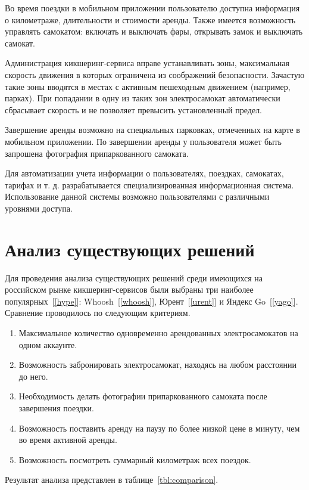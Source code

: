 Во время поездки в мобильном приложении пользователю доступна информация о километраже, длительности и стоимости аренды. Также имеется возможность управлять самокатом: включать и выключать фары, открывать замок и выключать самокат.

Администрация кикшеринг-сервиса вправе устанавливать зоны, максимальная скорость движения в которых ограничена из соображений безопасности. Зачастую такие зоны вводятся в местах с активным пешеходным движением (например, парках). При попадании в одну из таких зон электросамокат автоматически сбрасывает скорость и не позволяет превысить установленный предел.

Завершение аренды возможно на специальных парковках, отмеченных на карте в мобильном приложении. По завершении аренды у пользователя может быть запрошена фотография припаркованного самоката.

Для автоматизации учета информации о пользователях, поездках, самокатах, тарифах и т. д. разрабатывается специализированная информационная система. Использование данной системы возможно пользователями с различными уровнями доступа.

\section{Анализ существующих решений}

Для проведения анализа существующих решений среди имеющихся на российском рынке кикшеринг-сервисов были выбраны три наиболее популярных~[\ref{hype}]: Whoosh~[\ref{whoosh}], Юрент~[\ref{urent}] и Яндекс Go~[\ref{yago}]. Сравнение проводилось по следующим критериям.

\begin{enumerate}
	\item Максимальное количество одновременно арендованных электросамокатов на одном аккаунте.
	\item Возможность забронировать электросамокат, находясь на любом расстоянии до него.
	\item Необходимость делать фотографии припаркованного самоката после завершения поездки.
	\item Возможность поставить аренду на паузу по более низкой цене в минуту, чем во время активной аренды.
	\item Возможность посмотреть суммарный километраж всех поездок.
\end{enumerate}

Результат анализа представлен в таблице~\ref{tbl:comparison}.

